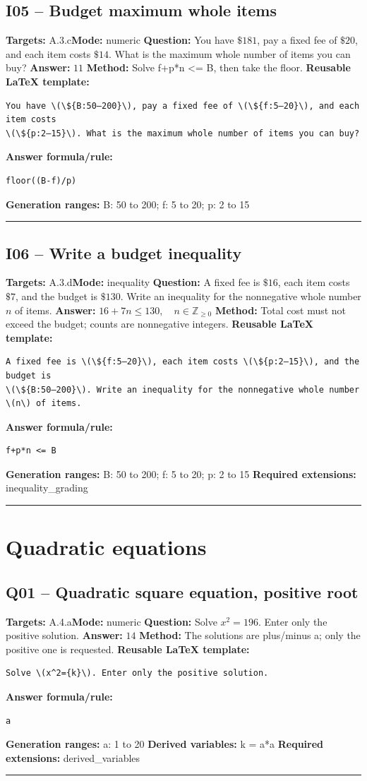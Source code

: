 \documentclass[11pt]{article}
\begin{document}
\subsection{I05 -- Budget maximum whole items}
\textbf{Targets:} A.3.c\quad\textbf{Mode:} numeric
\textbf{Question:} You have \(\$181\), pay a fixed fee of \(\$20\), and each item costs \(\$14\). What is the maximum whole number of items you can buy?
\textbf{Answer:} \(11\)
\textbf{Method:} Solve f+p*n <= B, then take the floor.
\textbf{Reusable LaTeX template:}
\begin{verbatim}
You have \(\${B:50–200}\), pay a fixed fee of \(\${f:5–20}\), and each item costs
\(\${p:2–15}\). What is the maximum whole number of items you can buy?
\end{verbatim}
\textbf{Answer formula/rule:}
\begin{verbatim}
floor((B-f)/p)
\end{verbatim}
\textbf{Generation ranges:} B: 50 to 200; f: 5 to 20; p: 2 to 15
\medskip\hrule\medskip
\subsection{I06 -- Write a budget inequality}
\textbf{Targets:} A.3.d\quad\textbf{Mode:} inequality
\textbf{Question:} A fixed fee is \(\$16\), each item costs \(\$7\), and the budget is \(\$130\). Write an inequality for the nonnegative whole number \(n\) of items.
\textbf{Answer:} \(16+7n\le 130,\quad n\in\mathbb Z_{\ge0}\)
\textbf{Method:} Total cost must not exceed the budget; counts are nonnegative integers.
\textbf{Reusable LaTeX template:}
\begin{verbatim}
A fixed fee is \(\${f:5–20}\), each item costs \(\${p:2–15}\), and the budget is
\(\${B:50–200}\). Write an inequality for the nonnegative whole number \(n\) of items.
\end{verbatim}
\textbf{Answer formula/rule:}
\begin{verbatim}
f+p*n <= B
\end{verbatim}
\textbf{Generation ranges:} B: 50 to 200; f: 5 to 20; p: 2 to 15
\textbf{Required extensions:} inequality\_grading
\medskip\hrule\medskip
\section{Quadratic equations}
\subsection{Q01 -- Quadratic square equation, positive root}
\textbf{Targets:} A.4.a\quad\textbf{Mode:} numeric
\textbf{Question:} Solve \(x^2=196\). Enter only the positive solution.
\textbf{Answer:} \(14\)
\textbf{Method:} The solutions are plus/minus a; only the positive one is requested.
\textbf{Reusable LaTeX template:}
\begin{verbatim}
Solve \(x^2={k}\). Enter only the positive solution.
\end{verbatim}
\textbf{Answer formula/rule:}
\begin{verbatim}
a
\end{verbatim}
\textbf{Generation ranges:} a: 1 to 20
\textbf{Derived variables:} k = a*a
\textbf{Required extensions:} derived\_variables
\medskip\hrule\medskip
\end{document}
